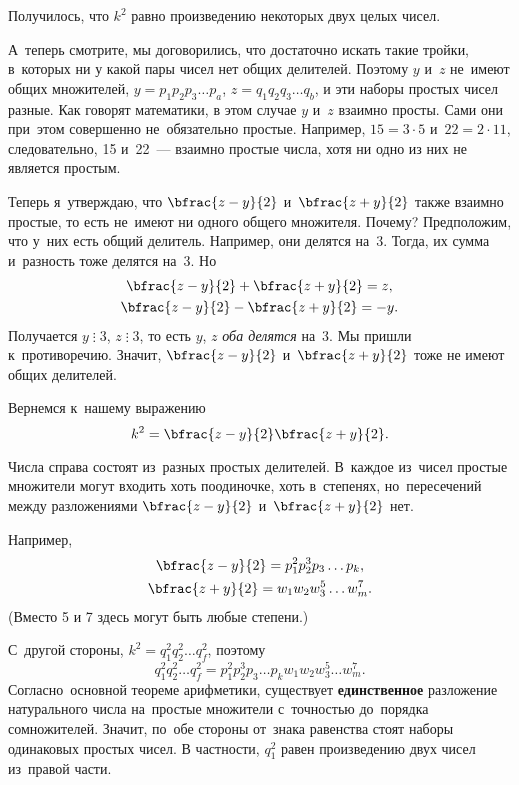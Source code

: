 Получилось, что $k^{2}$ равно произведению некоторых двух целых чисел.

А~теперь смотрите, мы договорились, что достаточно искать такие тройки, в~которых ни у какой пары чисел нет общих делителей. Поэтому
$y$ и~$z$ не~имеют общих множителей, $y=p_{1}p_{2}p_{3}\ldots p_{a}$, $z=q_{1}q_{2}q_{3}\ldots q_{b}$, и эти наборы простых чисел разные.
Как говорят математики, в этом случае $y$ и~$z$ взаимно просты. Сами они при~этом совершенно не~обязательно простые. Например, $15=3\cdot5$ и~$22=2\cdot11$,
следовательно, 15 и~22~--- взаимно простые числа, хотя ни одно из них не является простым.


Теперь я~утверждаю, что
$\bfrac{z-y}{2}$ и~$\bfrac{z+y}{2}$ также взаимно простые, то есть не~имеют ни одного общего множителя.
Почему? Предположим, что у~них есть общий делитель. Например, они делятся на~3. Тогда, их сумма и~разность тоже делятся на~3. Но
\begin{gather*}
\bfrac{z-y}{2}+\bfrac{z+y}{2}=z,\\
\bfrac{z-y}{2}-\bfrac{z+y}{2}=-y.
\end{gather*}
Получается $y\mathbin{\vdots}3$, $z\mathbin{\vdots}3$, то есть $y$, $z$ \textit{ оба делятся} на~3.
Мы пришли к~противоречию. Значит,
$\bfrac{z-y}{2}$ и~$\bfrac{z+y}{2}$ тоже не имеют общих делителей.


Вернемся к~нашему выражению
$$
k^{2}=\bfrac{z-y}{2}\bfrac{z+y}{2}.
$$

Числа справа состоят из~разных простых делителей. В~каждое из~чисел простые множители могут
входить хоть поодиночке, хоть в~степенях, но~пересечений между разложениями $\bfrac{z-y}{2}$ и~$\bfrac{z+y}{2}$ нет.


Например,
\begin{gather*}
\bfrac{z-y}{2}=p_{1}^{2}p_{2}^{3}p_{3}\ldots p_{k},\\
\bfrac{z+y}{2}=w_{1}w_{2}w_{3}^{5}\ldots w_{m}^{7}.
\end{gather*}
(Вместо 5 и 7 здесь могут быть любые степени.)

С~другой стороны, $k^{2}=q_{1}^{2}q_{2}^{2}\ldots q_{f}^{2}$, поэтому
$$
q_{1}^{2}q_{2}^{2}\ldots q_{f}^{2}=
p_{1}^{2}p_{2}^{3}p_{3}\ldots p_{k} w_{1}w_{2}w_{3}^{5}\ldots w_{m}^{7}.
$$
Согласно~основной теореме арифметики, существует \textbf{единственное} разложение натурального числа на~простые
множители с~точностью до~порядка сомножителей. Значит, по~обе стороны от~знака равенства стоят
наборы одинаковых простых чисел. В частности, $q_{1}^{2}$ равен произведению двух чисел из~правой части.

